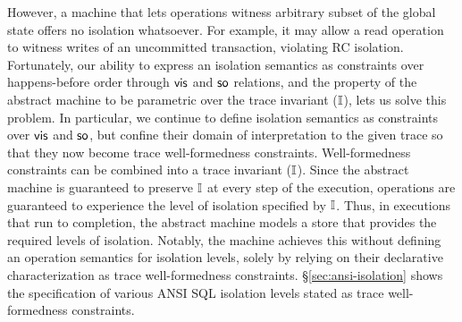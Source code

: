 However, a machine that lets operations witness arbitrary subset of
the global state offers no isolation whatsoever. For example, it may
allow a read operation to witness writes of an uncommitted
transaction, violating RC isolation. Fortunately, our ability to
express an isolation semantics as constraints over happens-before
order through $\textsf{vis}$ and $\textsf{so}$ relations, and the property of the
abstract machine to be parametric over the trace invariant ($\mathbb{I}$),
lets us solve this problem.  In particular, we continue to define
isolation semantics as constraints over $\textsf{vis}$ and $\textsf{so}$, but
confine their domain of interpretation to the given trace so that they
now become trace well-formedness constraints. Well-formedness
constraints can be combined into a trace invariant ($\mathbb{I}$). Since the
abstract machine is guaranteed to preserve $\mathbb{I}$ at every step of the
execution, operations are guaranteed to experience the level of
isolation specified by $\mathbb{I}$.  Thus, in executions that run to
completion, the abstract machine models a store that provides the
required levels of isolation. Notably, the machine achieves this
without defining an operation semantics for isolation levels, solely
by relying on their declarative characterization as trace
well-formedness constraints.  \S\ref{sec:ansi-isolation} shows the
specification of various ANSI SQL isolation levels stated as trace
well-formedness constraints.

